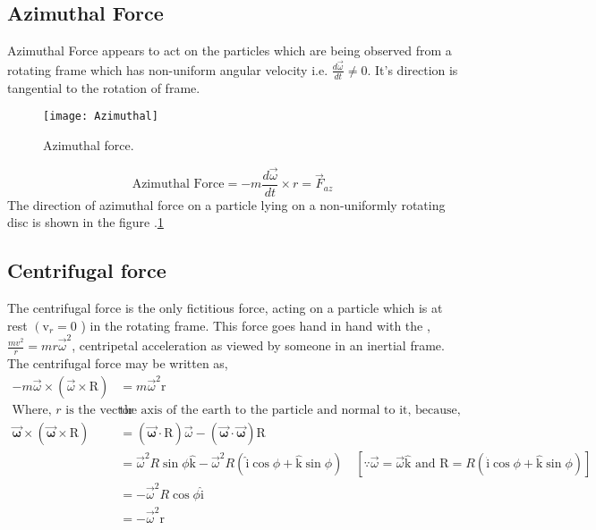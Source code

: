 \subsection{Azimuthal Force}
Azimuthal Force  appears to act on the particles which are being observed from a rotating frame which has non-uniform angular velocity i.e. $\frac{d \vec{\omega}}{d t} \neq 0$.
It's direction is tangential to the rotation of frame. 
\begin{figure}[H]
	\centering
	\texttt{[image: Azimuthal]}
	\caption{Azimuthal force.}
	\label{Azimuthal force}
\end{figure}
\begin{equation}
\text{Azimuthal Force}=-m \frac{d{\vec{\omega}}}{d t} \times r=\vec{F}_{a z}
\end{equation}  
The direction of azimuthal force on a particle lying on a non-uniformly rotating disc is shown in the figure .\ref{Azimuthal force}
\subsection{Centrifugal force}
 The centrifugal force is the only fictitious force, acting on a particle which is at rest $\left(\mathrm{v}_{r}=0\right.$ ) in the rotating frame.  This force goes hand in hand with the ,$ \frac{mv^{2}}{r}=mr\vec{\omega}^{2}$, centripetal acceleration as viewed by someone in an inertial frame. The centrifugal force may be written as, 
\begin{align*}
-m \vec{\omega} \times(\vec{\omega} \times \mathrm{R})&=m \vec{\omega}^{2} \mathrm{r}\\
\text{Where, $r$ is the vector from }&\text{the axis of the earth to the particle and normal to it, because,}\\
\boldsymbol{\vec{\omega}} \times(\boldsymbol{\vec{\omega}} \times \mathrm{R})&=(\boldsymbol{\vec{\omega}} \cdot \mathrm{R}) \vec{\omega}-(\boldsymbol{\vec{\omega}} \cdot \boldsymbol{\vec{\omega}}) \mathrm{R}\\&=\vec{\omega}^{2} R \sin \phi \hat{\mathrm{k}}-\vec{\omega}^{2} R(\hat{\mathrm{i}} \cos \phi+\hat{\mathrm{k}} \sin \phi) \quad[\because \vec{\omega}=\vec{\omega} \hat{\mathrm{k}} \text { and } \mathrm{R}=R(\hat{\mathrm{i}} \cos \phi+\hat{\mathrm{k}} \sin \phi)]\\
&=-\vec{\omega}^{2} R \cos \phi \hat{\mathrm{i}}\\
&=-\vec{\omega}^{2} \mathrm{r} 
\end{align*}
